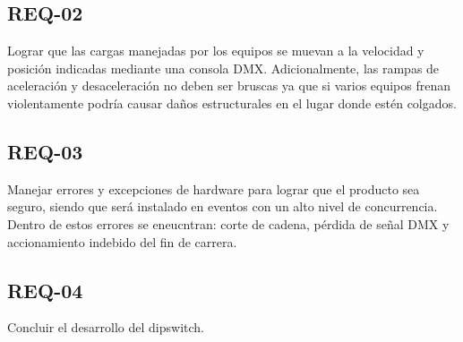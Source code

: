 \subsection{REQ-02}
Lograr que las cargas manejadas por los equipos se muevan a la velocidad y posición indicadas mediante una consola DMX. Adicionalmente, las rampas de aceleración y desaceleración no deben ser bruscas ya que si varios equipos frenan violentamente podría causar daños estructurales en el lugar donde estén colgados.
\subsection{REQ-03}
Manejar errores y excepciones de hardware para lograr que el producto sea seguro, siendo que será instalado en eventos con un alto nivel de concurrencia.\\
Dentro de estos errores se eneucntran: corte de cadena, pérdida de señal DMX y accionamiento indebido del fin de carrera.
\subsection{REQ-04}
Concluir el desarrollo del dipswitch.






